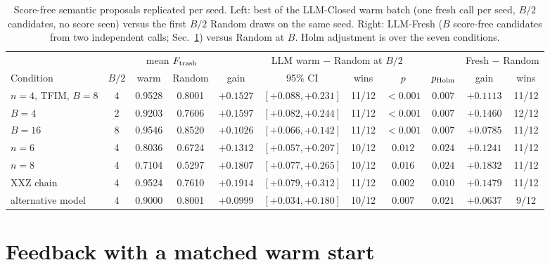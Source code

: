\documentclass[11pt]{article}
\begin{document}
\begin{table}[t]
\centering\small
\caption{Score-free semantic proposals replicated per seed. Left: best of the
LLM-Closed warm batch (one fresh call per seed, $B/2$ candidates, no score seen)
versus the first $B/2$ Random draws on the same seed. Right: LLM-Fresh ($B$ score-free
candidates from two independent calls; Sec.~\ref{sec:matched}) versus Random at $B$.
Holm adjustment is over the seven conditions.}
\label{tab:warm}
\footnotesize\setlength{\tabcolsep}{3pt}
\begin{tabular}{lcccccccc|cc}
\toprule
& & \multicolumn{2}{c}{mean $F_{\rm trash}$} & \multicolumn{5}{c|}{LLM warm $-$ Random at $B/2$} & \multicolumn{2}{c}{Fresh $-$ Random}\\
Condition & $B/2$ & warm & Random & gain & 95\% CI & wins & $p$ & $p_{\rm Holm}$ & gain & wins\\
\midrule
$n{=}4$, TFIM, $B{=}8$ & 4 & 0.9528 & 0.8001 & $+0.1527$ & $[+0.088,+0.231]$ & 11/12 & $<0.001$ & $0.007$ & $+0.1113$ & 11/12 \\
$B{=}4$ & 2 & 0.9203 & 0.7606 & $+0.1597$ & $[+0.082,+0.244]$ & 11/12 & $<0.001$ & $0.007$ & $+0.1460$ & 12/12 \\
$B{=}16$ & 8 & 0.9546 & 0.8520 & $+0.1026$ & $[+0.066,+0.142]$ & 11/12 & $<0.001$ & $0.007$ & $+0.0785$ & 11/12 \\
$n{=}6$ & 4 & 0.8036 & 0.6724 & $+0.1312$ & $[+0.057,+0.207]$ & 10/12 & $0.012$ & $0.024$ & $+0.1241$ & 11/12 \\
$n{=}8$ & 4 & 0.7104 & 0.5297 & $+0.1807$ & $[+0.077,+0.265]$ & 10/12 & $0.016$ & $0.024$ & $+0.1832$ & 11/12 \\
XXZ chain & 4 & 0.9524 & 0.7610 & $+0.1914$ & $[+0.079,+0.312]$ & 11/12 & $0.002$ & $0.010$ & $+0.1479$ & 11/12 \\
alternative model & 4 & 0.9000 & 0.8001 & $+0.0999$ & $[+0.034,+0.180]$ & 10/12 & $0.007$ & $0.021$ & $+0.0637$ & 9/12 \\
\bottomrule
\end{tabular}
\end{table}

\section{Feedback with a matched warm start}
\label{sec:matched}
\end{document}
